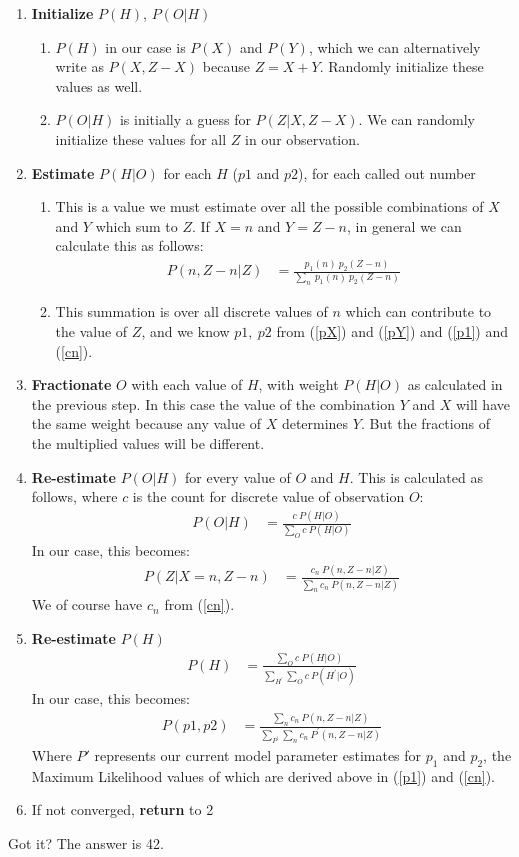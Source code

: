 \documentclass[11pt]{article}
\begin{document}
\begin{enumerate}
\item \textbf{Initialize} $P(H)$, $P(O | H)$ 
\begin{enumerate}
\item $P(H)$ in our case is $P(X)$ and $P(Y)$, which we can alternatively write as $P(X, Z - X)$ because $Z = X + Y$. Randomly initialize these values as well. 
\item $P(O | H)$ is initially a guess for $P(Z | X, Z - X)$. We can randomly initialize these values for all $Z$ in our observation.
\end{enumerate}
\item \textbf{Estimate} $P(H | O)$ for each $H$ ($p1$ and $p2$), for each called out number
\begin{enumerate}
\item {This is a value we must estimate over all the possible combinations of $X$ and $Y$ which sum to $Z$. If $X = n$ and $Y = Z - n$, in general we can calculate this as follows:
\begin{align}
P(n, Z - n | Z) &= \frac{p_1(n) \  p_2(Z - n)}{\sum_{n} \ p_1(n) \ p_2(Z - n)}
\end{align}}
\item This summation is over all discrete values of $n$ which can contribute to the value of $Z$, and we know $p1, \  p2$ from (\ref{pX}) and (\ref{pY}) and (\ref{p1}) and (\ref{cn}).
\end{enumerate}
\item \textbf{Fractionate} $O$ with each value of $H$, with weight $P(H | O)$ as calculated in the previous step. In this case the value of the combination $Y$ and $X$ will  have the same weight because any value of $X$ determines $Y$. But the fractions of the multiplied values will be different. 
\item \textbf{Re-estimate} $P(O | H)$ for every value of $O$ and $H$. This is calculated as follows, where $c$ is the count for discrete value of observation $O$:
\begin{align}
P(O | H) &= \frac{c \ P(H | O)}{\sum_O c \ P(H | O)}
\end{align}
In our case, this becomes: 
\begin{align}
P(Z | X=n, Z - n) &= \frac{c_n \ P(n, Z - n | Z)}{\sum_n c_n \ P(n, Z - n | Z)}
\end{align}
We of course have $c_n$ from (\ref{cn}).
\item \textbf{Re-estimate} $P(H)$
\begin{align}
P(H) &= \frac{\sum_O c \ P(H | O)}{\sum_{H^{\prime}} \sum_O c \ P(H^{\prime} | O)}
\end{align}
In our case, this becomes:
\begin{align}
P(p1,p2) &= \frac{\sum_n c_n \ P(n, Z - n | Z)}{\sum_{P^{\prime}} \sum_n c_n \ P^{\prime}(n, Z - n | Z)}
\end{align}
Where $P'$ represents our current model parameter estimates for $p_1$ and $p_2$, the Maximum Likelihood values of which are derived above in (\ref{p1}) and (\ref{cn}). 
\item If not converged, \textbf{return} to 2
\end{enumerate}


Got it? The answer is 42. 
\end{document}
